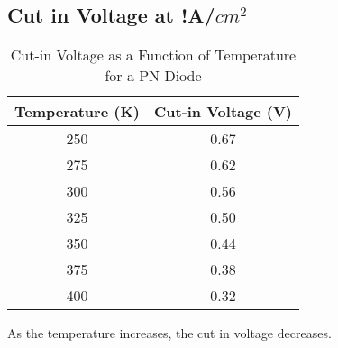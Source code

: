 \documentclass[a4paper]{article}
\begin{document}
\subsection{Cut in Voltage at !A/$cm^2$}
\begin{table}[h!]
\centering
\begin{tabular}{|c|c|}
\hline
\textbf{Temperature (K)} & \textbf{Cut-in Voltage (V)} \\ \hline
250                      & 0.67                        \\ \hline
275                      & 0.62                        \\ \hline
300                      & 0.56                        \\ \hline
325                      & 0.50                        \\ \hline
350                      & 0.44                        \\ \hline
375                      & 0.38                        \\ \hline
400                      & 0.32                        \\ \hline
\end{tabular}
\caption{Cut-in Voltage as a Function of Temperature for a PN Diode}
\label{tab:cutin_voltage_temperature}
\end{table}

As the temperature increases, the cut in voltage decreases.
\end{document}
